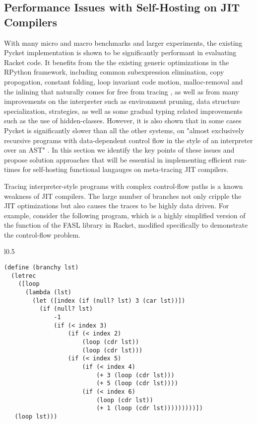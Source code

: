 \newpage

\subsection{Performance Issues with Self-Hosting on JIT Compilers}
\label{subsec:performance}

With many micro and macro benchmarks and larger experiments, the
existing Pycket implementation is shown to be significantly performant
in evaluating Racket code. It benefits from the the existing generic
optimizations in the RPython framework, including common subexpression
elimination, copy propogation, constant folding, loop invariant code
motion, malloc-removal and the inlining that naturally comes for free
from tracing \cite{loop-aware:12, hotpath:06, malloc-removal:11}, as
well as from many improvements on the interpreter such as environment
pruning, data structure specialization, strategies, as well as some
gradual typing related improvements such as the use of
hidden-classes. However, it is also shown that in some cases Pycket is
significantly slower than all the other systems, on "almost
exclusively recursive programs with data-dependent control flow in the
style of an interpreter over an AST" \cite{pycket15, pycket17}. In
this section we identify the key points of these issues and propose
solution approaches that will be essential in implementing efficient
run-times for self-hosting functional langauges on meta-tracing JIT
compilers.

Tracing interpreter-style programs with complex control-flow paths is
a known weakness of JIT compilers. The large number of branches not
only cripple the JIT optimizations but also causes the traces to be
highly data driven. For example, consider the following program, which
is a highly simplified version of the 
function of the FASL library in Racket, modified specifically to
demonstrate the control-flow problem.

\begin{wrapfigure}[18]{l}{0.5\textwidth}
\small
\begin{lstlisting}[mathescape]
(define (branchy lst)
  (letrec
    ([loop
      (lambda (lst)
        (let ([index (if (null? lst) 3 (car lst))])
          (if (null? lst)
              -1
              (if (< index 3)
                  (if (< index 2)
                      (loop (cdr lst))
                      (loop (cdr lst)))
                  (if (< index 5)
                      (if (< index 4)
                          (+ 3 (loop (cdr lst)))
                          (+ 5 (loop (cdr lst))))
                      (if (< index 6)
                          (loop (cdr lst))
                          (+ 1 (loop (cdr lst)))))))))])
   (loop lst)))
\end{lstlisting}
\end{wrapfigure}

